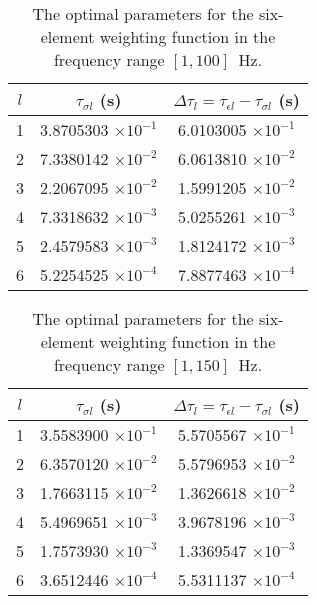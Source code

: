 \documentclass[article]{./macros/elsarticle_qh}
\begin{document}
\begin{table}[H]
\centering
\caption{The optimal parameters for the six-element weighting function in the frequency range $[1,100]$~Hz.}
\label{tab:tabl6}
\begin{tabular}{c c c}
\toprule
$l$ & $\tau_{\sigma l}$ (s) & $\Delta \tau_{l} = \tau_{\epsilon l}-\tau_{\sigma l}$ (s)\\
\midrule
1 &	3.8705303 $\times 10^{-1}$ & 6.0103005 $\times 10^{-1}$ \\
2 &	7.3380142 $\times 10^{-2}$ & 6.0613810 $\times 10^{-2}$ \\
3 &	2.2067095 $\times 10^{-2}$ & 1.5991205 $\times 10^{-2}$ \\
4 &	7.3318632 $\times 10^{-3}$ & 5.0255261 $\times 10^{-3}$ \\
5 &	2.4579583 $\times 10^{-3}$ & 1.8124172 $\times 10^{-3}$ \\
6 &	5.2254525 $\times 10^{-4}$ & 7.8877463 $\times 10^{-4}$ \\
\bottomrule   
\end{tabular}
\end{table}

\begin{table}[H]
\centering
\caption{The optimal parameters for the six-element weighting function in the frequency range $[1,150]$~Hz.}
\label{tab:tabl7}
\begin{tabular}{c c c}
\toprule
$l$ & $\tau_{\sigma l}$ (s) & $\Delta \tau_{l} = \tau_{\epsilon l}-\tau_{\sigma l}$ (s) \\
\midrule
1 &	3.5583900 $\times 10^{-1}$ & 5.5705567 $\times 10^{-1}$ \\
2 &	6.3570120 $\times 10^{-2}$ & 5.5796953 $\times 10^{-2}$ \\
3 &	1.7663115 $\times 10^{-2}$ & 1.3626618 $\times 10^{-2}$ \\
4 &	5.4969651 $\times 10^{-3}$ & 3.9678196 $\times 10^{-3}$ \\
5 &	1.7573930 $\times 10^{-3}$ & 1.3369547 $\times 10^{-3}$ \\
6 &	3.6512446 $\times 10^{-4}$ & 5.5311137 $\times 10^{-4}$ \\
\bottomrule 
\end{tabular}
\end{table}
\end{document}
